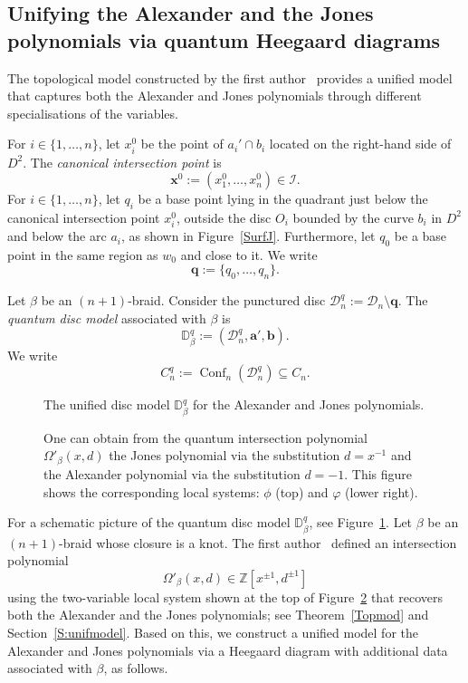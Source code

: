 \documentclass[11pt]{amsart}
\numberwithin{equation}{section}
\numberwithin{figure}{section}
\theoremstyle{definition}
\newcommand{\cD}{\mathcal{D}}
\newcommand{\cI}{\mathcal{I}}
\newcommand{\bD}{\mathbb{D}}
\newcommand{\bZ}{\mathbb{Z}}
\DeclareMathOperator{\Conf}{Conf}
\newcommand{\ba}{\boldsymbol{a}}
\newcommand{\bb}{\boldsymbol{b}}
\newcommand{\qs}{\boldsymbol{q}}
\newcommand{\xs}{\boldsymbol{x}}
\begin{document}
\subsection{Unifying the Alexander and the Jones polynomials via quantum Heegaard diagrams} 
The topological model constructed by the first author~\cite{Anghel2024AIF} provides a unified model that captures both the Alexander and Jones polynomials through different specialisations of the variables.

\begin{defn}\label{def:canonical-intersection-point}
For $i \in \{1,\dots,n\}$, let $x_i^0$ be the point of $a_i' \cap b_i$ located on the right-hand side of $D^2$. The \emph{canonical intersection point} is
\[
\xs^0:=(x_1^0,\dots,x_n^0) \in \cI.
\]
For $i \in \{1,\dots,n\}$, let $q_i$ be a base point lying in the quadrant just below the canonical intersection point $x_i^0$, outside the disc $O_i$ bounded by the curve $b_i$ in $D^2$ and below the arc $a_i$, as shown in Figure~\ref{SurfJ}. Furthermore, let $q_0$ be a base point in the same region as $w_0$ and close to it. We write
\[
\qs := \{q_0,\dots,q_n\}.
\]
\end{defn}

\begin{defn}\label{def:quantum-disc-model}
    Let $\beta$ be an $(n+1)$-braid. Consider the punctured disc $\cD^q_n := \cD_n \setminus \qs$. The \emph{quantum disc model} associated with $\beta$ is
    \[
    \bD^q_\beta := (\cD^q_n, \ba', \bb).
    \]
    We write 
    \[
    C_n^q := \Conf_n(\cD_n^q) \subseteq C_n.
    \]
\end{defn}

\begin{figure}
\centering
\def\svgwidth{1.2\textwidth}

\caption{The unified disc model $\bD_\beta^q$ for the Alexander and Jones polynomials.}\label{fig:quantum-disc-model}
\end{figure}

\begin{figure}
\centering
\def\svgwidth{\textwidth}

\caption{One can obtain from the quantum intersection polynomial $\Omega'_\beta(x,d)$ the Jones polynomial via the substitution $d=x^{-1}$ and the Alexander polynomial via the substitution $d=-1$. This figure shows the corresponding local systems: $\phi$ (top) and $\varphi$ (lower right).}
\label{fig:specialisations}
\end{figure}

For a schematic picture of the quantum disc model $\bD_\beta^q$, see Figure~\ref{fig:quantum-disc-model}. Let $\beta$ be an $(n+1)$-braid whose closure is a knot. The first author~\cite{Anghel2024AIF} defined an intersection polynomial
\[
\Omega'_\beta(x,d) \in \bZ\left[x^{\pm 1},d^{\pm 1}\right] 
\]
using the two-variable local system shown at the top of Figure~\ref{fig:specialisations} that recovers both the Alexander and the Jones polynomials; see Theorem~\ref{Topmod} and Section~\ref{S:unifmodel}. Based on this, we construct a unified model for the Alexander and Jones polynomials via a Heegaard diagram with additional data associated with $\beta$, as follows.
\end{document}
